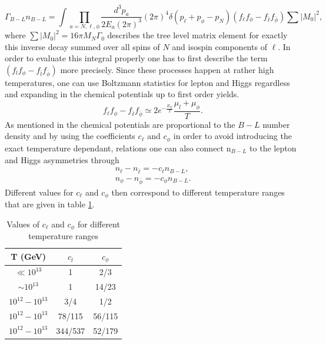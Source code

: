 \begin{equation}
\Gamma_{B-L}n_{B-L}=\int\prod_{a=N,\ell,\phi}\frac{d^3p_a}{2E_a(2\pi)^3}(2\pi)^4\delta(p_\ell+p_\phi-p_N)(	f_\ell f_\phi-f_{\bar{\ell}}f_{\bar{\phi}})\sum|M_0|^2,
\label{eq:Gamma_B-L}
\end{equation}
where $\sum|M_0|^2=16\pi M_N\Gamma_0$ describes the tree level matrix element for exactly this inverse decay summed over all spins of $N$ and isospin components of $\ell$. In order to evaluate this integral properly one has to first describe the term $(	f_lf_\phi-f_{\bar{l}}f_{\bar{\phi}})$ more precisely. Since these processes happen at rather high temperatures, one can use Boltzmann statistics for lepton and Higgs regardless and expanding in the chemical potentials up to first order yields.
\begin{equation}
	f_\ell f_\phi-f_{\bar{\ell}}f_{\bar{\phi}}\simeq 2e^{-\frac{E_N}{T}}\frac{\mu_l+\mu_\phi}{T}.
	\label{eq:distri_diff}
\end{equation}
As mentioned in \cite[p. 7]{Bodeker:2013qaa} the chemical potentials are proportional to the $B-L$ number density and by using the coefficients $c_\ell$ and $c_\phi$ in order to avoid introducing the exact temperature dependant, relations one can also connect n$_{B-L}$ to the lepton and Higgs asymmetries through \cite[p. 7]{Bodeker:2013qaa}
\begin{align}
	n_\ell-n_{\bar{\ell}}=-c_\ell n_{B-L},
	\label{eq:l-lbar} \\
	n_\phi-n_{\bar{\phi}}=-c_\phi n_{B-L}.
	\label{eq:phi-phibar}
\end{align}
Different values for $c_\ell$ and $c_\phi$ then correspond to different temperature ranges that are given in table \ref{tab:temperatur}\cite[Table 1]{Bodeker:2013qaa}.

	\begin{table}[H]
	\centering
	\begin{tabular}{c||c||c}
	T (GeV)& $c_l$ & $c_\phi$\\
	\hline
	$\ll10^{13}$&1&2/3\\
	$\sim10^{13}$&1&14/23\\
	$10^{12}-10^{13}$&3/4&1/2\\
	$10^{12}-10^{13}$&78/115&56/115\\
	$10^{12}-10^{13}$&344/537&52/179\\
	
	\end{tabular}
	\caption{Values of $c_\ell$ and $c_\phi$ for different temperature ranges}
	\label{tab:temperatur}
	\end{table}

